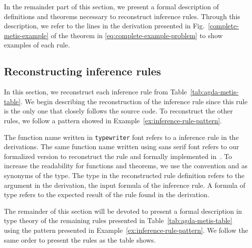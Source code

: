 \documentclass[../paper.tex]{subfiles}
\begin{document}
In the remainder part of this section, we present a formal description of
definitions and theorems necessary to reconstruct \Metis inference rules.
Through this description, we refer to the lines in the \Metis derivation
presented in Fig.~\ref{complete-metis-example} of the theorem in
\eqref{eq:complete-example-problem} to show examples of each rule.


\subsection{Reconstructing \Metis inference rules}
\label{ssec:emulating-inferences}

In this section, we reconstruct each \Metis inference rule from
Table~\ref{tab:agda-metis-table}.
We begin describing the reconstruction of the \strip inference rule
since this rule  is the only one that closely follows the \Metis
source code. To reconstruct the other rules, we follow a pattern showed
in Example~\ref{ex:inference-rule-pattern}.

\begin{notation}

  The function name written in \texttt{typewriter} font refers to a \Metis
  inference rule in the \TSTP derivations. The same function name written using
  \textsf{sans serif} font refers to our formalized version to reconstruct the
  rule and formally implemented in~\cite{AgdaMetis}. To increase the readability
  for functions and theorems, we use the convention \Source and \Target as
  synonyms of the \Prop type. The \Source type in the reconstructed rule
  definition refers to the argument in the \TSTP derivation, \ie the input
  formula of the inference rule. A formula of \Target type refers to the
  expected result of the rule found in the \TSTP derivation.

\end{notation}



The remainder of this section will be devoted to present a formal description in
type theory of the remaining \Metis rules presented in
Table~\ref{tab:agda-metis-table} using the pattern presented in
Example~\ref{ex:inference-rule-pattern}. We follow the same order to present the
rules as the table shows.
\end{document}
